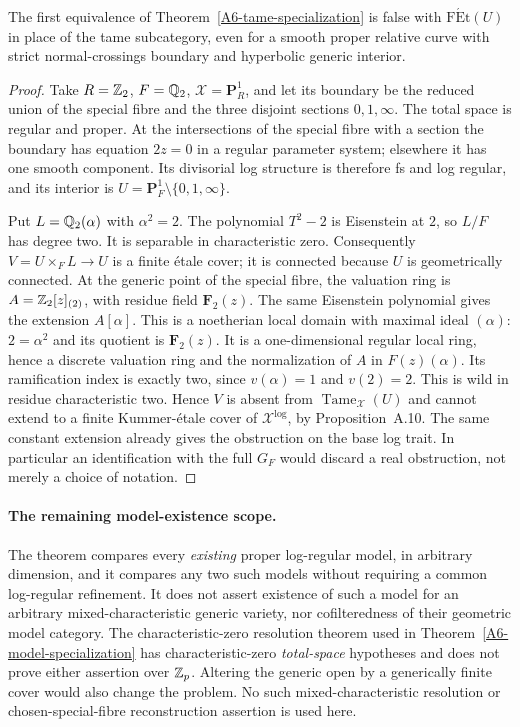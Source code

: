\begin{proposition}\label{A6-wild-counterexample}
The first equivalence of Theorem~\ref{A6-tame-specialization} is false
with $\operatorname{F\acute Et}(U)$ in place of the tame subcategory,
even for a smooth proper relative curve with strict normal-crossings
boundary and hyperbolic generic interior.
\end{proposition}
\begin{proof}
Take $R={\mathbb{Z}}_2$, $F={\mathbb{Q}}_2$, $\mathcal X=\mathbf P^1_R$, and let its
boundary be the reduced union of the special fibre and the three
disjoint sections $0,1,\infty$. The total space is regular and proper.
At the intersections of the special fibre with a section the boundary
has equation $2z=0$ in a regular parameter system; elsewhere it has
one smooth component. Its divisorial log structure is therefore fs
and log regular, and its interior is
$U=\mathbf P^1_F\setminus\{0,1,\infty\}$.

Put $L={\mathbb{Q}}_2(\alpha)$ with $\alpha^2=2$. The polynomial $T^2-2$ is
Eisenstein at $2$, so $L/F$ has degree two. It is separable in
characteristic zero. Consequently $V=U\times_F L\to U$ is a finite
\'etale cover; it is connected because $U$ is geometrically connected.
At the generic point of the special fibre, the valuation ring is
$A={\mathbb{Z}}_2[z]_{(2)}$, with residue field $\mathbf F_2(z)$.
The same Eisenstein polynomial gives the extension $A[\alpha]$.
This is a noetherian local domain with maximal ideal $(\alpha)$:
$2=\alpha^2$ and its quotient is $\mathbf F_2(z)$. It is a
one-dimensional regular local ring, hence a discrete valuation ring
and the normalization of $A$ in $F(z)(\alpha)$. Its ramification
index is exactly two, since $v(\alpha)=1$ and $v(2)=2$.
This is wild in residue characteristic two. Hence $V$ is absent from
$\operatorname{Tame}_{\mathcal X}(U)$ and cannot extend to a finite
Kummer-\'etale cover of $\mathcal X^{\log}$, by Proposition~A.10.
The same constant extension already gives the obstruction on the
base log trait. In particular an identification with the full $G_F$
would discard a real obstruction, not merely a choice of notation.
\end{proof}

\paragraph{The remaining model-existence scope.}
The theorem compares every \emph{existing} proper log-regular model,
in arbitrary dimension, and it compares any two such models without
requiring a common log-regular refinement. It does not assert existence
of such a model for an arbitrary mixed-characteristic generic variety,
nor cofilteredness of their geometric model category. The
characteristic-zero resolution theorem used in
Theorem~\ref{A6-model-specialization} has characteristic-zero
\emph{total-space} hypotheses and does not prove either assertion over
${\mathbb{Z}}_p$. Altering the generic open by a generically finite cover would
also change the problem. No such mixed-characteristic resolution or
chosen-special-fibre reconstruction assertion is used here.

